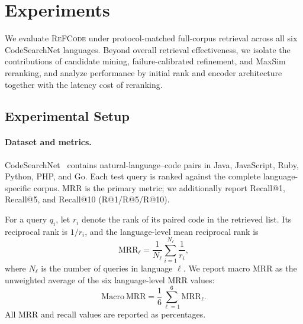 \documentclass[11pt]{article}
\newcommand{\method}{\textsc{ReFCode}}
\begin{document}
\section{Experiments}
\label{sec:experiments}

We evaluate \method{} under protocol-matched full-corpus retrieval across all six CodeSearchNet languages. Beyond overall retrieval effectiveness, we isolate the contributions of candidate mining, failure-calibrated refinement, and MaxSim reranking, and analyze performance by initial rank and encoder architecture together with the latency cost of reranking.

\subsection{Experimental Setup}
\label{sec:experimental_setup}

\paragraph{Dataset and metrics.}
CodeSearchNet~\citep{CodeSearchNet} contains natural-language--code pairs in Java, JavaScript, Ruby, Python, PHP, and Go. Each test query is ranked against the complete language-specific corpus. MRR is the primary metric; we additionally report Recall@1, Recall@5, and Recall@10 (R@1/R@5/R@10).

For a query \(q_i\), let \(r_i\) denote the rank of its paired code in the retrieved list. Its reciprocal rank is \(1/r_i\), and the language-level mean reciprocal rank is
\[
\mathrm{MRR}_{\ell}
=
\frac{1}{N_{\ell}}
\sum_{i=1}^{N_{\ell}}
\frac{1}{r_i},
\]
where \(N_{\ell}\) is the number of queries in language \(\ell\). We report macro MRR as the unweighted average of the six language-level MRR values:
\[
\mathrm{Macro\ MRR}
=
\frac{1}{6}
\sum_{\ell=1}^{6}
\mathrm{MRR}_{\ell}.
\]
All MRR and recall values are reported as percentages.
\end{document}
